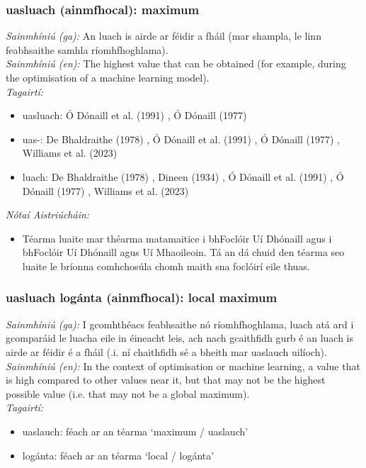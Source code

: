 \subsubsection*{uasluach (ainmfhocal): maximum}
 \noindent \textit{Sainmhíniú (ga):} An luach is airde ar féidir a fháil (mar shampla, le linn feabhsaithe samhla ríomhfhoghlama).
\\
 \noindent \textit{Sainmhíniú (en):} The highest value that can be obtained (for example, during the optimisation of a machine learning model).
\\
 \noindent \textit{Tagairtí:}
\begin{itemize}
	\item uasluach: Ó Dónaill et al. (1991) \cite{focloir-beag}, Ó Dónaill (1977) \cite{odonaill}
	\item uas-: De Bhaldraithe (1978) \cite{de-bhaldraithe}, Ó Dónaill et al. (1991) \cite{focloir-beag}, Ó Dónaill (1977) \cite{odonaill}, Williams et al. (2023) \cite{storchiste}
	\item luach: De Bhaldraithe (1978) \cite{de-bhaldraithe}, Dineen (1934) \cite{dineen}, Ó Dónaill et al. (1991) \cite{focloir-beag}, Ó Dónaill (1977) \cite{odonaill}, Williams et al. (2023) \cite{storchiste}
\end{itemize}

 \noindent \textit{Nótaí Aistriúcháin:}
\begin{itemize}
	\item Téarma luaite mar théarma matamaitice i bhFoclóir Uí Dhónaill agus i bhFoclóir Uí Dhónaill agus Uí Mhaoileoin. Tá an dá chuid den téarma seo luaite le bríonna comhchosúla chomh maith sna foclóirí eile thuas.
\end{itemize}


\subsubsection*{uasluach logánta (ainmfhocal): local maximum}
 \noindent \textit{Sainmhíniú (ga):} I gcomhthéacs feabhsaithe nó ríomhfhoghlama, luach atá ard i gcomparáid le luacha eile in éineacht leis, ach nach gcaithfidh gurb é an luach is airde ar féidir é a fháil (.i. ní chaithfidh sé a bheith mar uaslauch uilíoch).
\\
 \noindent \textit{Sainmhíniú (en):} In the context of optimisation or machine learning, a value that is high compared to other values near it, but that may not be the highest possible value (i.e. that may not be a global maximum).
\\
 \noindent \textit{Tagairtí:}
\begin{itemize}
	\item uaslauch: féach ar an téarma `maximum / uaslauch'
	\item logánta: féach ar an téarma `local / logánta'
\end{itemize}


